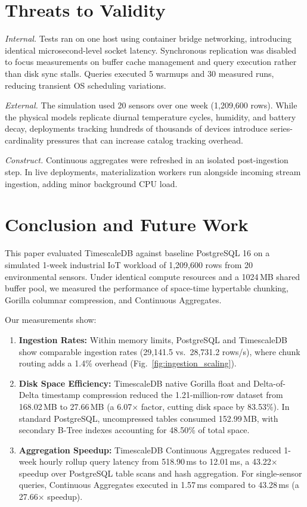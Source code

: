 \documentclass[conference,a4paper]{IEEEtran}
\begin{document}
\section{Threats to Validity}
\emph{Internal.} Tests ran on one host using container bridge networking, introducing identical microsecond-level socket latency. Synchronous replication was disabled to focus measurements on buffer cache management and query execution rather than disk sync stalls. Queries executed 5 warmups and 30 measured runs, reducing transient OS scheduling variations.

\emph{External.} The simulation used 20 sensors over one week (1,209,600 rows). While the physical models replicate diurnal temperature cycles, humidity, and battery decay, deployments tracking hundreds of thousands of devices introduce series-cardinality pressures that can increase catalog tracking overhead.

\emph{Construct.} Continuous aggregates were refreshed in an isolated post-ingestion step. In live deployments, materialization workers run alongside incoming stream ingestion, adding minor background CPU load.

\section{Conclusion and Future Work}
This paper evaluated TimescaleDB against baseline PostgreSQL 16 on a simulated 1-week industrial IoT workload of 1,209,600 rows from 20 environmental sensors. Under identical compute resources and a 1024\,MB shared buffer pool, we measured the performance of space-time hypertable chunking, Gorilla columnar compression, and Continuous Aggregates.

Our measurements show:
\begin{enumerate}
    \item \textbf{Ingestion Rates:} Within memory limits, PostgreSQL and TimescaleDB show comparable ingestion rates (29,141.5 vs.\ 28,731.2 rows/s), where chunk routing adds a 1.4\% overhead (Fig.~\ref{fig:ingestion_scaling}).
    \item \textbf{Disk Space Efficiency:} TimescaleDB native Gorilla float and Delta-of-Delta timestamp compression reduced the 1.21-million-row dataset from 168.02\,MB to 27.66\,MB (a 6.07$\times$ factor, cutting disk space by 83.53\%). In standard PostgreSQL, uncompressed tables consumed 152.99\,MB, with secondary B-Tree indexes accounting for 48.50\% of total space.
    \item \textbf{Aggregation Speedup:} TimescaleDB Continuous Aggregates reduced 1-week hourly rollup query latency from 518.90\,ms to 12.01\,ms, a 43.22$\times$ speedup over PostgreSQL table scans and hash aggregation. For single-sensor queries, Continuous Aggregates executed in 1.57\,ms compared to 43.28\,ms (a 27.66$\times$ speedup).
\end{enumerate}
\end{document}
